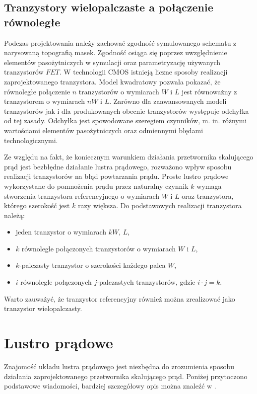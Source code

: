\documentclass[10pt,a4paper,twoside]{report}
\theoremstyle{definition}
\theoremstyle{definition}
\theoremstyle{definition}
\theoremstyle{definition}
\theoremstyle{definition}
\begin{document}
	\subsection{Tranzystory wielopalczaste a połączenie równoległe}
	{	Podczas projektowania należy zachować zgodność symulowanego schematu z narysowaną topografią masek. Zgodność osiąga się poprzez uwzględnienie elementów pasożytniczych w symulacji oraz parametryzację używanych tranzystorów $FET$. W technologii CMOS istnieją liczne sposoby realizacji zaprojektowanego tranzystora. Model kwadratowy pozwala pokazać, że równoległe połączenie $n$ tranzystorów o wymiarach $W$ i $L$ jest równoważny z tranzystorem o wymiarach $nW$ i $L$. Zarówno dla zaawansowanych modeli tranzystorów jak i dla produkowanych obecnie tranzystorów występuje odchyłka od tej zasady. Odchyłka jest spowodowane szeregiem czynników, m. in. różnymi wartościami elementów pasożytniczych oraz odmiennymi błędami technologicznymi. }
	
	{ 	Ze względu na fakt, że koniecznym warunkiem działania przetwornika skalującego prąd jest bezbłędne działanie lustra prądowego, rozważono wpływ sposobu realizacji tranzystorów na błąd powtarzania prądu. Proste lustro prądowe wykorzystane do pomnożenia prądu przez naturalny czynnik $k$ wymaga stworzenia tranzystora referencyjnego o wymiarach $W$ i $L$ oraz tranzystora, którego szerokość jest $k$ razy większa. Do podstawowych realizacji tranzystora należą:
	\begin{itemize}
		\item jeden tranzystor o wymiarach $kW$, $L$,
		\item $k$ równolegle połączonych tranzystorów o wymiarach $W$ i $L$,
		\item $k$-palczasty tranzystor o szerokości każdego palca $W$,
		\item $i$ równolegle połączonych $j$-palczastych tranzystorów, gdzie $i \cdot j = k$.
	\end{itemize}
	Warto zauważyć, że tranzystor referencyjny również można zrealizować jako tranzystor wielopalczasty. }

	\section{Lustro prądowe}
	{	Znajomość układu lustra prądowego jest niezbędna do zrozumienia sposobu działania zaprojektowanego przetwornika skalującego prąd. Poniżej przytoczono podstawowe wiadomości, bardziej szczegółowy opis można znaleźć w \cite{cmosanal}.}
\end{document}
